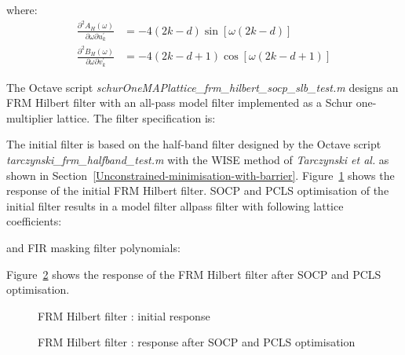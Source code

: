 \documentclass[a4paper,twoside,10pt,english]{report}
\begin{document}
where:
\begin{align*}
  \frac{\partial^{2} A_{H}\left(\omega\right)}
  {\partial\omega\partial u_{k}^{\prime}}
  &= -4\left(2k-d\right)\sin\left[\omega{}\left(2k-d\right)\right] \\
  \frac{\partial^{2} B_{H}\left(\omega\right)}
  {\partial\omega\partial v_{k}^{\prime}}
  &= -4\left(2k-d+1\right)\cos\left[\omega{}\left(2k-d+1\right)\right] 
\end{align*}

The Octave script
\emph{schurOneMAPlattice\_frm\_hilbert\_socp\_slb\_test.m} designs an FRM
Hilbert filter with an all-pass model filter implemented as a Schur
one-multiplier lattice. The filter specification is:
\begin{small}

\end{small}

The initial filter is based on the half-band filter designed by the Octave
script \emph{tarczynski\_frm\_halfband\_test.m} with the WISE method of
\emph{Tarczynski et al.} as shown in
Section~\ref{Unconstrained-minimisation-with-barrier}.
Figure~\ref{fig:schurOneMAPlattice-frm-Hilbert-initial-response} shows the
response of the initial FRM Hilbert filter.
SOCP and PCLS optimisation of the initial filter results in a 
model filter allpass filter with following lattice coefficients:
\begin{small}


\end{small}
and FIR masking filter polynomials:
\begin{small}


\end{small}
Figure~\ref{fig:schurOneMAPlattice-frm-Hilbert-pcls-response} shows the
response of the FRM Hilbert filter after SOCP and PCLS optimisation.
\begin{figure}[!htbp]
\begin{center}
\scalebox{0.7}{}
\caption{FRM Hilbert filter : initial response}
\label{fig:schurOneMAPlattice-frm-Hilbert-initial-response}
\end{center}
\end{figure}
\begin{figure}[!htbp]
\begin{center}
\scalebox{0.7}{}
\caption{FRM Hilbert filter : response after SOCP and PCLS optimisation}
\label{fig:schurOneMAPlattice-frm-Hilbert-pcls-response}
\end{center}
\end{figure}
\end{document}
